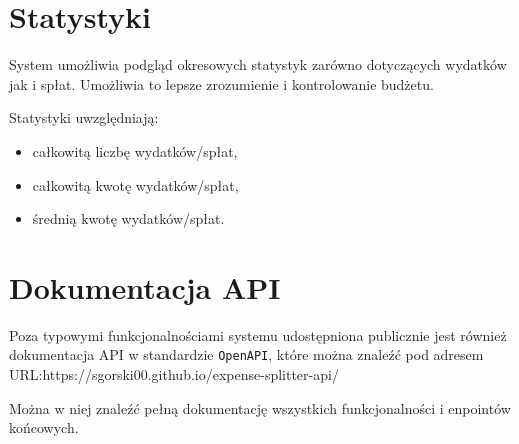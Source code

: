 \section{Statystyki}

System umożliwia podgląd okresowych statystyk zarówno dotyczących wydatków jak i spłat. Umożliwia to lepsze zrozumienie i kontrolowanie budżetu.

Statystyki uwzględniają:
\begin{itemize}
	\item całkowitą liczbę wydatków/spłat,
	\item całkowitą kwotę wydatków/spłat,
	\item średnią kwotę wydatków/spłat.
\end{itemize}

\section{Dokumentacja API}

Poza typowymi funkcjonalnościami systemu udostępniona publicznie jest również dokumentacja API w standardzie \verb|OpenAPI|, które można znaleźć pod adresem URL:\newline https://sgorski00.github.io/expense-splitter-api/

Można w niej znaleźć pełną dokumentację wszystkich funkcjonalności i enpointów końcowych.
